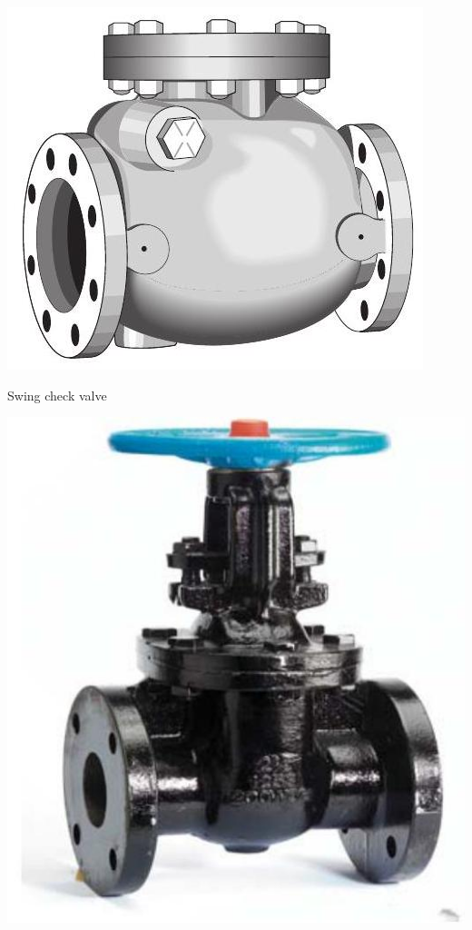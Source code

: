 \documentclass[10pt]{article}
\begin{document}
\includegraphics[max width=\textwidth]{SwingCheckValve}

Swing check valve

\includegraphics[max width=\textwidth]{GateValve}
\end{document}
